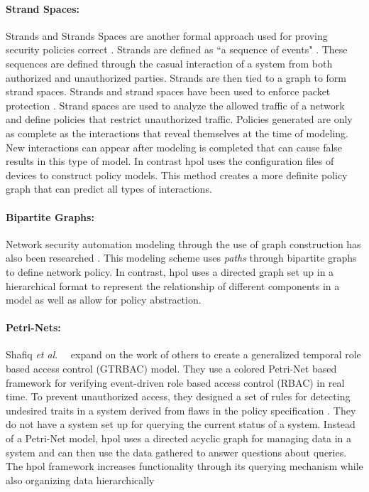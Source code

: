 \documentclass[12pt,letterpaper]{report}
\newcommand{\etal}{\textit{et al}.\ }
\begin{document}
\paragraph{Strand Spaces:}Strands and Strands Spaces are another formal approach used for proving security policies correct \cite{ThayerFabrega98c} \cite{ThayerFabrega98b}. Strands are defined as ``a sequence of events" \cite{ThayerFabrega99a}. These sequences are defined through the casual interaction of a system from both authorized and unauthorized parties. Strands are then tied to a graph to form strand spaces. Strands and strand spaces have been used to enforce packet protection \cite{Guttman01b}. Strand spaces are used to analyze the allowed traffic of a network and define policies that restrict unauthorized traffic. Policies generated are only as complete as the interactions that reveal themselves at the time of modeling. New interactions can appear after modeling is completed that can cause false results in this type of model. In contrast \ac{hpol} uses the configuration files of devices to construct policy models. This method creates a more definite policy graph that can predict all types of interactions.

\paragraph{Bipartite Graphs:}Network security automation modeling through the use of graph construction has also been researched \cite{Guttman05b}. This modeling scheme uses \textit{paths} through bipartite graphs to define network policy. In contrast, \ac{hpol} uses a directed graph set up in a hierarchical format to represent the relationship of different components in a model as well as allow for policy abstraction. 

\paragraph{Petri-Nets:}Shafiq \etal\ \cite{shafiq2005role} expand on the work of others to create a generalized temporal role based access control (GTRBAC) model. They use a colored Petri-Net based framework for verifying event-driven role based access control (RBAC) in real time. To prevent unauthorized access, they designed a set of rules for detecting undesired traits in a system derived from flaws in the policy specification \cite{shafiq2005role}. They do not have a system set up for querying the current status of a system. Instead of a Petri-Net model, \ac{hpol} uses a directed acyclic graph for managing data in a system and can then use the data gathered to answer questions about queries. The \ac{hpol} framework increases functionality through its querying mechanism while also organizing data hierarchically
\end{document}
